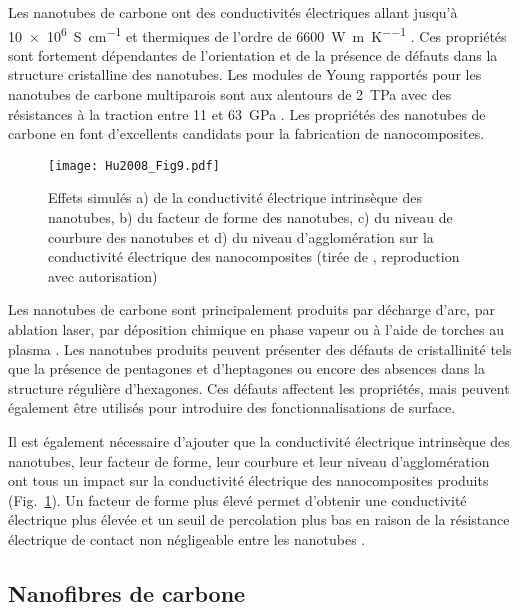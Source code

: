 Les nanotubes de carbone ont des conductivités électriques allant jusqu'à \SI[locale=FR]{10e6}{\siemens\per\centi\metre}  \cite{Sathyanarayana2013} et thermiques de l'ordre de \SI[locale=FR]{6600}{\watt\per\metre\per\kelvin} \cite{Berber2000}. 
Ces propriétés sont fortement dépendantes de l'orientation et de la présence de défauts dans la structure cristalline des nanotubes. 
Les modules de Young rapportés pour les nanotubes de carbone multiparois sont aux alentours de \SI{2}{\tera\pascal} avec des résistances à la traction entre 11 et \SI[locale=FR]{63}{\giga\pascal} \cite{Mittal2014h}. 
Les propriétés des nanotubes de carbone en font d'excellents candidats pour la fabrication de nanocomposites. 

\begin{figure}[htb]
	\centering
	\texttt{[image: Hu2008\_Fig9.pdf]}
	\caption{Effets simulés a) de la conductivité électrique intrinsèque des nanotubes, b) du facteur de forme des nanotubes, c) du niveau de courbure des nanotubes et d) du niveau d'agglomération sur la conductivité électrique des nanocomposites (tirée de \cite{Hu2008}, reproduction avec autorisation)}
	\label{fig:facteurs_geometriques_CNT}
\end{figure}

\FloatBarrier
Les nanotubes de carbone sont principalement produits par décharge d'arc, par ablation laser, par déposition chimique en phase vapeur \cite{Sathyanarayana2013} ou à l'aide de torches au plasma \cite{Kim2009e}. 
Les nanotubes produits peuvent présenter des défauts de cristallinité tels que la présence de pentagones et d'heptagones ou encore des absences dans la structure régulière d'hexagones. 
Ces défauts affectent les propriétés, mais peuvent également être utilisés pour introduire des fonctionnalisations de surface. 

Il est également nécessaire d'ajouter que la conductivité électrique intrinsèque des nanotubes, leur facteur de forme, leur courbure et leur niveau d'agglomération ont tous un impact sur la conductivité électrique des nanocomposites produits (Fig.~\ref{fig:facteurs_geometriques_CNT}). 
Un facteur de forme plus élevé permet d'obtenir une conductivité électrique plus élevée et un seuil de percolation plus bas en raison de la résistance électrique de contact non négligeable entre les nanotubes \cite{Hu2008}. 

\subsection{Nanofibres de carbone}

